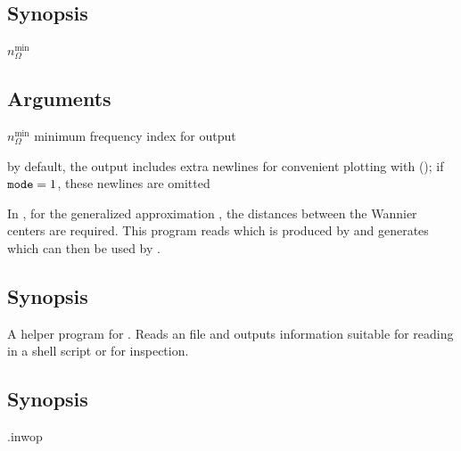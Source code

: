 \subsection{Synopsis}
\newcommand*\Nfreq{$n_{Ω}^\text{min}$\xspace}
\begin{usage}
  \kanalysis \Nfreq {}
\end{usage}

\subsection{Arguments}
\begin{options}
\item [\Nfreq] minimum frequency index for output

\item [\codeit{mode}]  by default, the output includes
  extra newlines for convenient plotting with \gnuplot (); if $\texttt{mode} = 1$,
  these newlines are omitted
  
\end{options}



In \woptic, for the generalized  approximation
\cite{Tomczak2009a}, the distances between the Wannier centers are
required.  This program reads  which is
produced by \wannier and generates  which can
then be used by \woptic.

\subsection{Synopsis}
\begin{usage}
  \obdist \case
\end{usage}



A helper program for \woprog.  Reads an  file and outputs
information suitable for reading in a shell script or for inspection.

\subsection{Synopsis}
\begin{usage}
  \inwopcheck \case.inwop
\end{usage}


